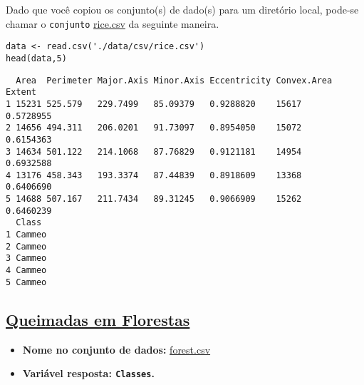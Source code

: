 \documentclass[12pt]{article}
\begin{document}
Dado que você copiou os conjunto(s) de dado(s) para um diretório
local, pode-se chamar o \texttt{conjunto} \href{https://drive.google.com/file/d/1zFkHbui6Ro2N\_tNsgPSeajyl7g8XrdAc/view?usp=sharing}{rice.csv} da seguinte maneira.

\begin{verbatim}
data <- read.csv('./data/csv/rice.csv')
head(data,5)
\end{verbatim}

\begin{verbatim}
  Area  Perimeter Major.Axis Minor.Axis Eccentricity Convex.Area Extent   
1 15231 525.579   229.7499   85.09379   0.9288820    15617       0.5728955
2 14656 494.311   206.0201   91.73097   0.8954050    15072       0.6154363
3 14634 501.122   214.1068   87.76829   0.9121181    14954       0.6932588
4 13176 458.343   193.3374   87.44839   0.8918609    13368       0.6406690
5 14688 507.167   211.7434   89.31245   0.9066909    15262       0.6460239
  Class 
1 Cammeo
2 Cammeo
3 Cammeo
4 Cammeo
5 Cammeo
\end{verbatim}
\clearpage

\subsection{\href{https://archive.ics.uci.edu/ml/datasets/Algerian+Forest+Fires+Dataset++}{Queimadas em Florestas}}
\label{sec:orga494250}
\begin{itemize}
\item \textbf{Nome no conjunto de dados:} \href{https://drive.google.com/file/d/1zuMrZgUo9vRH80HA7zJiBRJpBkGBw3hb/view?usp=sharing}{forest.csv}
\item \textbf{Variável resposta:  \texttt{Classes}.}
\end{itemize}
\end{document}
